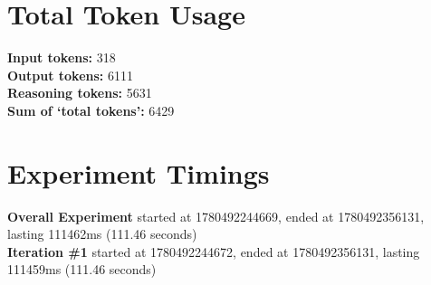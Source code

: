\documentclass{article}
\begin{document}
\section*{Total Token Usage}
\textbf{Input tokens: }318
\\\textbf{Output tokens: }6111
\\\textbf{Reasoning tokens: }5631
\\\textbf{Sum of `total tokens': }6429
\section*{Experiment Timings}
\textbf{Overall Experiment} started at 1780492244669, ended at 1780492356131, lasting 111462ms (111.46 seconds)
\\\textbf{Iteration \#1} started at 1780492244672, ended at 1780492356131, lasting 111459ms (111.46 seconds)
\end{document}
